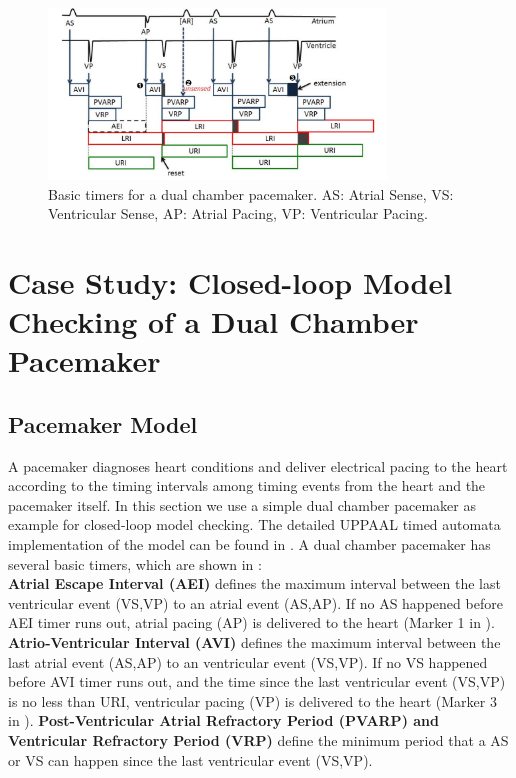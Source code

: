 \begin{figure}[!t]
		\centering
		\includegraphics[width=0.8\textwidth]{figs/PM_timers.pdf}
		\caption{\small Basic timers for a dual chamber pacemaker. AS: Atrial Sense, VS: Ventricular Sense, AP: Atrial Pacing, VP: Ventricular Pacing.}
		\label{fig:PM_timers}
\end{figure}
\section{Case Study: Closed-loop Model Checking of a Dual Chamber Pacemaker}
\subsection{Pacemaker Model}
A pacemaker diagnoses heart conditions and deliver electrical pacing to the heart according to the timing intervals among timing events from the heart and the pacemaker itself. In this section we use a simple dual chamber pacemaker as example for closed-loop model checking. The detailed UPPAAL timed automata implementation of the model can be found in \cite{sttt13}. A dual chamber pacemaker has several basic timers, which are shown in :\\
\textbf{Atrial Escape Interval (AEI)} defines the maximum interval between the last ventricular event (VS,VP) to an atrial event (AS,AP). If no AS happened before AEI timer runs out, atrial pacing (AP) is delivered to the heart (Marker 1 in ). \\
\textbf{Atrio-Ventricular Interval (AVI)} defines the maximum interval between the last atrial event (AS,AP) to an ventricular event (VS,VP). If no VS happened before AVI timer runs out, and the time since the last ventricular event (VS,VP) is no less than URI, ventricular pacing (VP) is delivered to the heart (Marker 3 in ).
\textbf{Post-Ventricular Atrial Refractory Period (PVARP) and Ventricular Refractory Period (VRP)} define the minimum period that a AS or VS can happen since the last ventricular event (VS,VP). 

